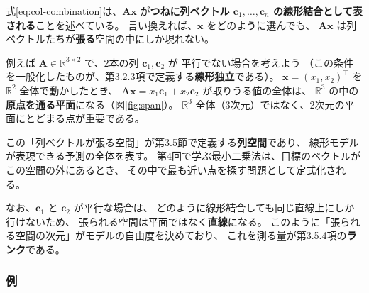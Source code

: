 
式\eqref{eq:col-combination}は、$\bm{A}\bm{x}$ が\textbf{つねに列ベクトル
$\bm{c}_1, \ldots, \bm{c}_n$ の線形結合として表される}ことを述べている。
言い換えれば、$\bm{x}$ をどのように選んでも、
$\bm{A}\bm{x}$ は列ベクトルたちが\textbf{張る}空間の中にしか現れない。

例えば $\bm{A} \in \mathbb{R}^{3 \times 2}$ で、2本の列 $\bm{c}_1, \bm{c}_2$ が
平行でない場合を考えよう
（この条件を一般化したものが、第3.2.3項で定義する\textbf{線形独立}である）。
$\bm{x} = (x_1, x_2)^\top$ を $\mathbb{R}^2$ 全体で動かしたとき、
$\bm{A}\bm{x} = x_1\bm{c}_1 + x_2\bm{c}_2$ が取りうる値の全体は、
$\mathbb{R}^3$ の中の\textbf{原点を通る平面}になる（図\ref{fig:span}）。
$\mathbb{R}^3$ 全体（3次元）ではなく、2次元の平面にとどまる点が重要である。

この「列ベクトルが張る空間」が第3.5節で定義する\textbf{列空間}であり、
線形モデルが表現できる予測の全体を表す。
第4回で学ぶ最小二乗法は、目標のベクトルがこの空間の外にあるとき、
その中で最も近い点を探す問題として定式化される。

なお、$\bm{c}_1$ と $\bm{c}_2$ が平行な場合は、
どのように線形結合しても同じ直線上にしか行けないため、
張られる空間は平面ではなく\textbf{直線}になる。
このように「張られる空間の次元」がモデルの自由度を決めており、
これを測る量が第3.5.4項の\textbf{ランク}である。

\subsubsection{例}

